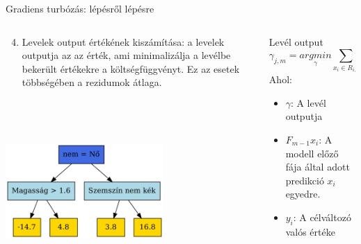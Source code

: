 \documentclass[english, aspectratio=169]{beamer}
\begin{document}
\begin{frame}{Gradiens turbózás: lépésről lépésre}
\begin{columns}
\begin{column}{.5\textwidth}
\begin{enumerate}
	\setcounter{enumi}{3}
	\item Levelek output értékének kiszámítása: a levelek outputja az az érték, ami minimalizálja a levélbe bekerült értékekre a költségfüggvényt. Ez az esetek többségében a rezidumok átlaga. 
\end{enumerate}
\begin{center}
\includegraphics[width=6cm, height=7cm, keepaspectratio]{graphs/ensemble_6.png}
\end{center}
\end{column}
\begin{column}{.5\textwidth}
\begin{block}{Levél output}
\[
\gamma_{j,m} = \underset{\gamma}{argmin} \sum_{x_i \in R_{i,j}} L\left( y_i, F_{m-1}\left( x_i \right) + \gamma \right)
\]
Ahol:
\begin{itemize}
	\item $\gamma$: A levél outputja
	\item $F_{m-1}x_i$: A modell előző fája által adott predikció $x_i$ egyedre. 
	\item $y_i$: A célváltozó valós értéke
\end{itemize}
\end{block}
\end{column}
\end{columns}
\end{frame}
\end{document}
